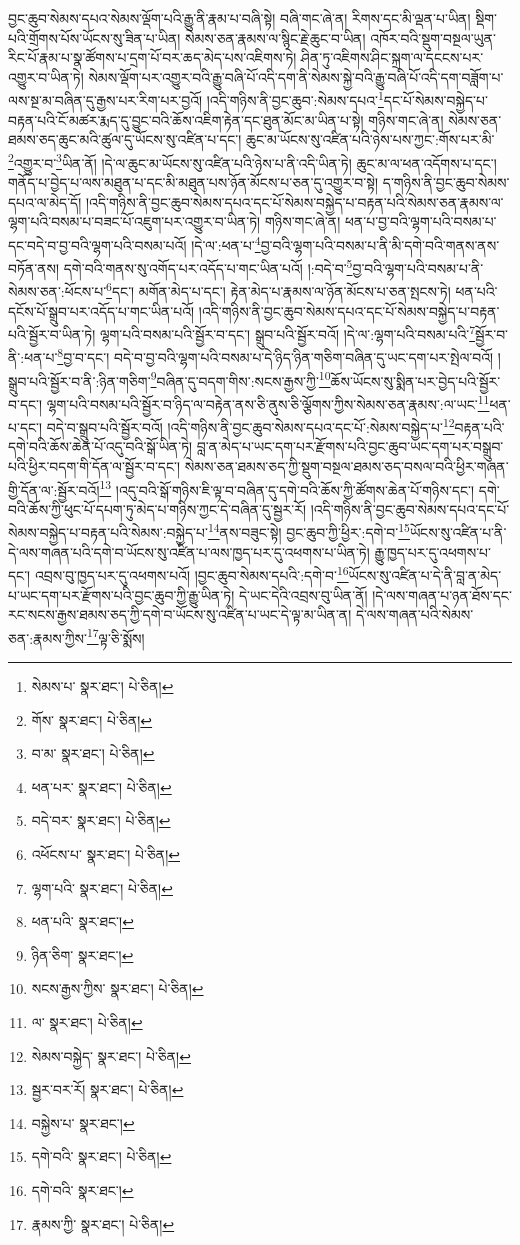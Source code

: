 བྱང་ཆུབ་སེམས་དཔའ་སེམས་ལྡོག་པའི་རྒྱུ་ནི་རྣམ་པ་བཞི་སྟེ། བཞི་གང་ཞེ་ན། རིགས་དང་མི་ལྡན་པ་ཡིན། སྡིག་པའི་གྲོགས་པོས་ཡོངས་སུ་ཟིན་པ་ཡིན། སེམས་ཅན་རྣམས་ལ་སྙིང་རྗེ་ཆུང་བ་ཡིན། འཁོར་བའི་སྡུག་བསྔལ་ཡུན་རིང་པོ་རྣམ་པ་སྣ་ཚོགས་པ་དྲག་པོ་བར་ཆད་མེད་པས་འཇིགས་ཏེ། ཤིན་ཏུ་འཇིགས་ཤིང་སྐྲག་ལ་དངངས་པར་འགྱུར་བ་ཡིན་ཏེ། སེམས་ལྡོག་པར་འགྱུར་བའི་རྒྱུ་བཞི་པོ་འདི་དག་ནི་སེམས་སྐྱེ་བའི་རྒྱུ་བཞི་པོ་འདི་དག་བཟློག་པ་ལས་སྔ་མ་བཞིན་དུ་རྒྱས་པར་རིག་པར་བྱའོ། །འདི་གཉིས་ནི་བྱང་ཆུབ་:སེམས་དཔའ་\footnote{སེམས་པ་  སྣར་ཐང་།  པེ་ཅིན། }དང་པོ་སེམས་བསྐྱེད་པ་བརྟན་པའི་ངོ་མཚར་རྨད་དུ་བྱུང་བའི་ཆོས་འཇིག་རྟེན་དང་ཐུན་མོང་མ་ཡིན་པ་སྟེ། གཉིས་གང་ཞེ་ན། སེམས་ཅན་ཐམས་ཅད་ཆུང་མའི་ཚུལ་དུ་ཡོངས་སུ་འཛིན་པ་དང་། ཆུང་མ་ཡོངས་སུ་འཛིན་པའི་ཉེས་པས་ཀྱང་:གོས་པར་མི་\footnote{གོས་  སྣར་ཐང་།  པེ་ཅིན། }འགྱུར་བ་\footnote{བ་མ་  སྣར་ཐང་།  པེ་ཅིན། }ཡིན་ནོ། །དེ་ལ་ཆུང་མ་ཡོངས་སུ་འཛིན་པའི་ཉེས་པ་ནི་འདི་ཡིན་ཏེ། ཆུང་མ་ལ་ཕན་འདོགས་པ་དང་། གནོད་པ་བྱེད་པ་ལས་མཐུན་པ་དང་མི་མཐུན་པས་ཉོན་མོངས་པ་ཅན་དུ་འགྱུར་བ་སྟེ། ད་གཉིས་ནི་བྱང་ཆུབ་སེམས་དཔའ་ལ་མེད་དོ། །འདི་གཉིས་ནི་བྱང་ཆུབ་སེམས་དཔའ་དང་པོ་སེམས་བསྐྱེད་པ་བརྟན་པའི་སེམས་ཅན་རྣམས་ལ་ལྷག་པའི་བསམ་པ་བཟང་པོ་འཇུག་པར་འགྱུར་བ་ཡིན་ཏེ། གཉིས་གང་ཞེ་ན། ཕན་པ་བྱ་བའི་ལྷག་པའི་བསམ་པ་དང་བདེ་བ་བྱ་བའི་ལྷག་པའི་བསམ་པའོ། །དེ་ལ་:ཕན་པ་\footnote{ཕན་པར་  སྣར་ཐང་།  པེ་ཅིན། }བྱ་བའི་ལྷག་པའི་བསམ་པ་ནི་མི་དགེ་བའི་གནས་ནས་བཏོན་ནས། དགེ་བའི་གནས་སུ་འགོད་པར་འདོད་པ་གང་ཡིན་པའོ། །:བདེ་བ་\footnote{བདེ་བར་  སྣར་ཐང་།  པེ་ཅིན། }བྱ་བའི་ལྷག་པའི་བསམ་པ་ནི་སེམས་ཅན་:ཕོངས་པ་\footnote{འཕོངས་པ་  སྣར་ཐང་།  པེ་ཅིན། }དང་། མགོན་མེད་པ་དང་། རྟེན་མེད་པ་རྣམས་ལ་ཉོན་མོངས་པ་ཅན་སྤངས་ཏེ། ཕན་པའི་དངོས་པོ་སྒྲུབ་པར་འདོད་པ་གང་ཡིན་པའོ། །འདི་གཉིས་ནི་བྱང་ཆུབ་སེམས་དཔའ་དང་པོ་སེམས་བསྐྱེད་པ་བརྟན་པའི་སྦྱོར་བ་ཡིན་ཏེ། ལྷག་པའི་བསམ་པའི་སྦྱོར་བ་དང་། སྒྲུབ་པའི་སྦྱོར་བའོ། །དེ་ལ་:ལྷག་པའི་བསམ་པའི་\footnote{ལྷག་པའི་  སྣར་ཐང་།  པེ་ཅིན། }སྦྱོར་བ་ནི་:ཕན་པ་\footnote{ཕན་པའི་  སྣར་ཐང་། }བྱ་བ་དང་། བདེ་བ་བྱ་བའི་ལྷག་པའི་བསམ་པ་དེ་ཉིད་ཉིན་གཅིག་བཞིན་དུ་ཡང་དག་པར་སྤེལ་བའོ། །སྒྲུབ་པའི་སྦྱོར་བ་ནི་:ཉིན་གཅིག་\footnote{ཉིན་ཅིག་  སྣར་ཐང་། }བཞིན་དུ་བདག་གིས་:སངས་རྒྱས་ཀྱི་\footnote{སངས་རྒྱས་ཀྱིས་  སྣར་ཐང་།  པེ་ཅིན། }ཆོས་ཡོངས་སུ་སྨིན་པར་བྱེད་པའི་སྦྱོར་བ་དང་། ལྷག་པའི་བསམ་པའི་སྦྱོར་བ་ཉིད་ལ་བརྟེན་ནས་ཅི་ནུས་ཅི་ལྕོགས་ཀྱིས་སེམས་ཅན་རྣམས་:ལ་ཡང་\footnote{ལ་  སྣར་ཐང་།  པེ་ཅིན། }ཕན་པ་དང་། བདེ་བ་སྒྲུབ་པའི་སྦྱོར་བའོ། །འདི་གཉིས་ནི་བྱང་ཆུབ་སེམས་དཔའ་དང་པོ་:སེམས་བསྐྱེད་པ་\footnote{སེམས་བསྐྱེད་  སྣར་ཐང་།  པེ་ཅིན། }བརྟན་པའི་དགེ་བའི་ཆོས་ཆེན་པོ་འདུ་བའི་སྒོ་ཡིན་ཏེ། བླ་ན་མེད་པ་ཡང་དག་པར་རྫོགས་པའི་བྱང་ཆུབ་ཡང་དག་པར་བསྒྲུབ་པའི་ཕྱིར་བདག་གི་དོན་ལ་སྦྱོར་བ་དང་། སེམས་ཅན་ཐམས་ཅད་ཀྱི་སྡུག་བསྔལ་ཐམས་ཅད་བསལ་བའི་ཕྱིར་གཞན་གྱི་དོན་ལ་:སྦྱོར་བའོ།\footnote{སྦྱར་བར་རོ།  སྣར་ཐང་།  པེ་ཅིན། } །འདུ་བའི་སྒོ་གཉིས་ཇི་ལྟ་བ་བཞིན་དུ་དགེ་བའི་ཆོས་ཀྱི་ཚོགས་ཆེན་པོ་གཉིས་དང་། དགེ་བའི་ཆོས་ཀྱི་ཕུང་པོ་དཔག་ཏུ་མེད་པ་གཉིས་ཀྱང་དེ་བཞིན་དུ་སྦྱར་རོ། །འདི་གཉིས་ནི་བྱང་ཆུབ་སེམས་དཔའ་དང་པོ་སེམས་བསྐྱེད་པ་བརྟན་པའི་སེམས་:བསྐྱེད་པ་\footnote{བསྐྱེས་པ་  སྣར་ཐང་། }ནས་བཟུང་སྟེ། བྱང་ཆུབ་ཀྱི་ཕྱིར་:དགེ་བ་\footnote{དགེ་བའི་  སྣར་ཐང་།  པེ་ཅིན། }ཡོངས་སུ་འཛིན་པ་ནི་དེ་ལས་གཞན་པའི་དགེ་བ་ཡོངས་སུ་འཛིན་པ་ལས་ཁྱད་པར་དུ་འཕགས་པ་ཡིན་ཏེ། རྒྱུ་ཁྱད་པར་དུ་འཕགས་པ་དང་། འབྲས་བུ་ཁྱད་པར་དུ་འཕགས་པའོ། །བྱང་ཆུབ་སེམས་དཔའི་:དགེ་བ་\footnote{དགེ་བའི་  སྣར་ཐང་། }ཡོངས་སུ་འཛིན་པ་དེ་ནི་བླ་ན་མེད་པ་ཡང་དག་པར་རྫོགས་པའི་བྱང་ཆུབ་ཀྱི་རྒྱུ་ཡིན་ཏེ། དེ་ཡང་དེའི་འབྲས་བུ་ཡིན་ནོ། །དེ་ལས་གཞན་པ་ཉན་ཐོས་དང་རང་སངས་རྒྱས་ཐམས་ཅད་ཀྱི་དགེ་བ་ཡོངས་སུ་འཛིན་པ་ཡང་དེ་ལྟ་མ་ཡིན་ན། དེ་ལས་གཞན་པའི་སེམས་ཅན་:རྣམས་ཀྱིས་\footnote{རྣམས་ཀྱི་  སྣར་ཐང་།  པེ་ཅིན། }ལྟ་ཅི་སྨོས། 